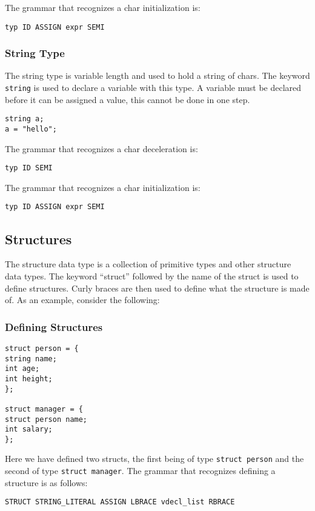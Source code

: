 \documentclass{article}
\begin{document}
The grammar that recognizes a char initialization is: 
\begin{Verbatim}[frame=single]
typ ID ASSIGN expr SEMI
\end{Verbatim}

\subsubsection{String Type}
The string type is variable length and used to hold a string of chars.  The keyword \texttt{string} is used to declare a variable with this type.  A variable must be declared before it can be assigned a value, this cannot be done in one step.
\begin{lstlisting}
string a;
a = "hello";
\end{lstlisting}

The grammar that recognizes a char deceleration is: 
\begin{Verbatim}[frame=single]
typ ID SEMI
\end{Verbatim}

The grammar that recognizes a char initialization is: 
\begin{Verbatim}[frame=single]
typ ID ASSIGN expr SEMI
\end{Verbatim}

\subsection{Structures}
The structure data type is a collection of primitive types and other structure data types. The keyword ``struct'' followed by the name of the struct is used to define structures. Curly braces are then used to define what the structure is made of. As an example, consider the following:

\subsubsection{Defining Structures}

\begin{lstlisting}
struct person = {
string name;
int age;
int height;
};

struct manager = {
struct person name;
int salary;
};
\end{lstlisting}
Here we have defined two structs, the first being of type \texttt{struct person} and the second of type \texttt{struct manager}.  The grammar that recognizes defining a structure is as follows:

\begin{Verbatim}[frame=single]
STRUCT STRING_LITERAL ASSIGN LBRACE vdecl_list RBRACE
\end{Verbatim}
\end{document}
